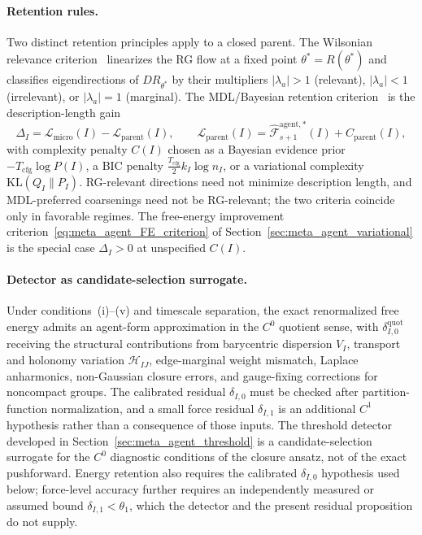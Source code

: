 \documentclass[11pt]{article}
\begin{document}
\paragraph{Retention rules.}
Two distinct retention principles apply to a closed parent. The Wilsonian relevance criterion~\cite{Wilson1971, Wilson1974} linearizes the RG flow at a fixed point $\theta^* = R(\theta^*)$ and classifies eigendirections of $DR_{\theta^*}$ by their multipliers $|\lambda_a| > 1$ (relevant), $|\lambda_a| < 1$ (irrelevant), or $|\lambda_a| = 1$ (marginal). The MDL/Bayesian retention criterion~\cite{Schwarz1978, Rissanen1978} is the description-length gain
\begin{equation}
\Delta_I = \mathcal{L}_{\mathrm{micro}}(I) - \mathcal{L}_{\mathrm{parent}}(I), \qquad \mathcal{L}_{\mathrm{parent}}(I) = \widehat{\mathcal{F}}_{s+1}^{\mathrm{agent},*}(I) + C_{\mathrm{parent}}(I),
\label{eq:rg_retention_gain}
\end{equation}
with complexity penalty $C(I)$ chosen as a Bayesian evidence prior $-T_{\mathrm{cfg}}\log P(I)$, a BIC penalty $\tfrac{T_{\mathrm{cfg}}}{2} k_I \log n_I$, or a variational complexity $\mathrm{KL}(Q_I \| P_I)$. RG-relevant directions need not minimize description length, and MDL-preferred coarsenings need not be RG-relevant; the two criteria coincide only in favorable regimes. The free-energy improvement criterion~\eqref{eq:meta_agent_FE_criterion} of Section~\ref{sec:meta_agent_variational} is the special case $\Delta_I > 0$ at unspecified $C(I)$.

\paragraph{Detector as candidate-selection surrogate.}
Under conditions~(i)--(v) and timescale separation, the exact renormalized free energy admits an agent-form approximation in the $C^0$ quotient sense, with $\delta_{I,0}^{\mathrm{quot}}$ receiving the structural contributions from barycentric dispersion $V_I$, transport and holonomy variation $\mathcal{H}_{IJ}$, edge-marginal weight mismatch, Laplace anharmonics, non-Gaussian closure errors, and gauge-fixing corrections for noncompact groups. The calibrated residual $\delta_{I,0}$ must be checked after partition-function normalization, and a small force residual $\delta_{I,1}$ is an additional $C^1$ hypothesis rather than a consequence of those inputs. The threshold detector developed in Section~\ref{sec:meta_agent_threshold} is a candidate-selection surrogate for the $C^0$ diagnostic conditions of the closure ansatz, not of the exact pushforward. Energy retention also requires the calibrated $\delta_{I,0}$ hypothesis used below; force-level accuracy further requires an independently measured or assumed bound $\delta_{I,1}<\theta_1$, which the detector and the present residual proposition do not supply.
\end{document}
